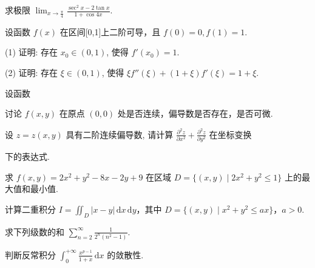 求极限 $\lim_{x\to \frac{\pi}{4}}\frac{\sec^2x - 2\tan x}{1 + \cos 4x}.$\par
设函数 $f(x)$ 在区间[0,1]上二阶可导，且 $f(0) = 0, f(1) = 1$.\par
(1) 证明: 存在 $x_0 \in (0,1)$, 使得 $f'(x_0) = 1$.\par
(2) 证明: 存在 $\xi \in (0,1)$, 使得 $\xi f''(\xi) + (1 + \xi)f'(\xi) = 1 + \xi$.\par
\par{}
设函数\par
\nopagebreak[4]
讨论 $f(x,y)$ 在原点 $(0,0)$ 处是否连续，偏导数是否存在，是否可微.\par
\par{}
设 $z = z(x, y)$ 具有二阶连续偏导数, 请计算 $\frac{\partial^2 z}{\partial x^2} + \frac{\partial^2 z}{\partial y^2}$ 在坐标变换\par
\nopagebreak[4]
下的表达式.\par
求 $f(x, y) = 2x^{2} + y^{2} - 8x - 2y + 9$ 在区域 $D = \{(x, y) \mid 2x^{2} + y^{2} \leq 1\}$ 上的最大值和最小值.\par
计算二重积分 $I = \iint_{D} |x - y| \, \mathrm{d}x \, \mathrm{d}y$，其中 $D = \{(x, y) \mid x^2 + y^2 \leq ax\}$，$a > 0$.\par
求下列级数的和 $\sum_{n=2}^{\infty} \frac{1}{2^n (n^2 - 1)}$.\par
判断反常积分 $\int_0^{+\infty} \frac{x^{p-1}}{1 + x} \, \mathrm{d}x$ 的敛散性.\par
